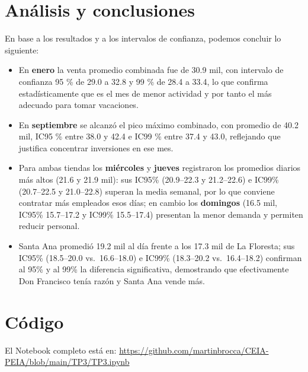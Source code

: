 \documentclass[12pt,a4paper]{article}
\begin{document}
\section{Análisis y conclusiones}
En base a los resultados y a los intervalos de confianza, podemos concluir lo siguiente:

\begin{itemize}
  \item En \textbf{enero} la venta promedio combinada fue de 30.9 mil, con intervalo de confianza 95 \% de 29.0 a 32.8 y 99 \% de 28.4 a 33.4, lo que confirma estadísticamente que es el mes de menor actividad y por tanto el más adecuado para tomar vacaciones.
  \item En \textbf{septiembre} se alcanzó el pico máximo combinado, con promedio de 40.2 mil, IC95 \% entre 38.0 y 42.4 e IC99 \% entre 37.4 y 43.0, reflejando que justifica concentrar inversiones en ese mes.
  \item Para ambas tiendas los \textbf{miércoles} y \textbf{jueves} registraron los promedios diarios más altos (21.6 y 21.9 mil): sus IC95\% (20.9–22.3 y 21.2–22.6) e IC99\% (20.7–22.5 y 21.0–22.8) superan la media semanal, por lo que conviene contratar más empleados esos días; en cambio los \textbf{domingos} (16.5 mil, IC95\% 15.7–17.2 y IC99\% 15.5–17.4) presentan la menor demanda y permiten reducir personal.
  \item Santa Ana promedió 19.2 mil al día frente a los 17.3 mil de La Floresta; sus IC95\% (18.5–20.0 vs.\ 16.6–18.0) e IC99\% (18.3–20.2 vs.\ 16.4–18.2) confirman al 95\% y al 99\% la diferencia significativa, demostrando que efectivamente Don Francisco tenía razón y Santa Ana vende más.
\end{itemize}

\section*{Código}
El Notebook completo está en:\newline
\url{https://github.com/martinbrocca/CEIA-PEIA/blob/main/TP3/TP3.ipynb}
\end{document}
